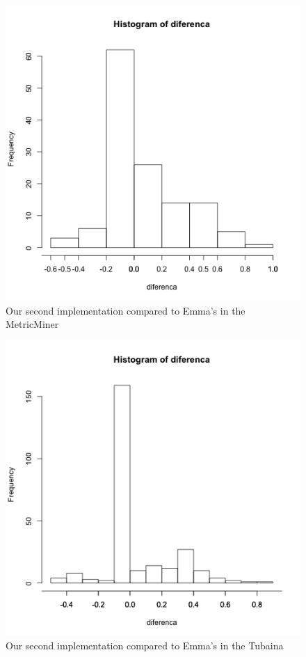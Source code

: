 \documentclass{sig-alternate}
\begin{document}
\begin{figure}[h!H]
  \centering
  \includegraphics[scale=0.3]{../stats/metricminer-histograma-aspectj.png}
  \caption{Our second implementation compared to Emma's in the MetricMiner}
  \label{fig:metricminer-aj}
\end{figure}

\begin{figure}[h!H]
  \centering
  \includegraphics[scale=0.3]{../stats/tubaina-histograma-aspectj.png}
  \caption{Our second implementation compared to Emma's in the Tubaina}
  \label{fig:tubaina-aj}
\end{figure}
\end{document}
